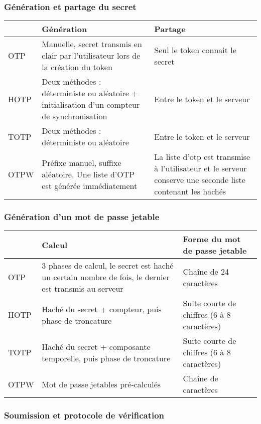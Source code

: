 \subsubsection{Génération et partage du secret}

	\begin{tabular}{| p{3cm} | p{6cm} | p{6cm} |}
		\hline
		& \cellcolor{gray} Génération & \cellcolor{gray} Partage \\
		\hline
		OTP & Manuelle, secret transmis en clair par l'utilisateur lors de la
		création du token & Seul le token connait le secret \\
		\hline
		HOTP & Deux méthodes : déterministe ou aléatoire + initialisation d'un
		compteur de synchronisation & Entre le token et le serveur \\
		\hline
		TOTP & Deux méthodes : déterministe ou aléatoire & Entre le token et
		le serveur \\
		\hline
		OTPW & Préfixe manuel, suffixe aléatoire. Une liste d'OTP est générée
		immédiatement & La liste d'otp est transmise à l'utilisateur et le
		serveur conserve une seconde liste contenant les hachés \\
		\hline
	\end{tabular}

\subsubsection{Génération d'un mot de passe jetable}

	\begin{tabular}{| p{3cm} | p{6cm} | p{6cm} |}
		\hline
		& \cellcolor{gray} Calcul & \cellcolor{gray} Forme du mot de passe
		jetable \\
		\hline
		OTP & 3 phases de calcul, le secret est haché un certain nombre de
		fois, le dernier est transmis au serveur & Chaîne de 24 caractères \\
		\hline
		HOTP & Haché du secret + compteur, puis phase de troncature & Suite
		courte de chiffres (6 à 8 caractères) \\
		\hline
		TOTP & Haché du secret + composante temporelle, puis phase de
		troncature & Suite courte de chiffres (6 à 8 caractères) \\
		\hline
		OTPW & Mot de passe jetables pré-calculés & Chaîne de caractères \\
		\hline
	\end{tabular}

\subsubsection{Soumission et protocole de vérification}

